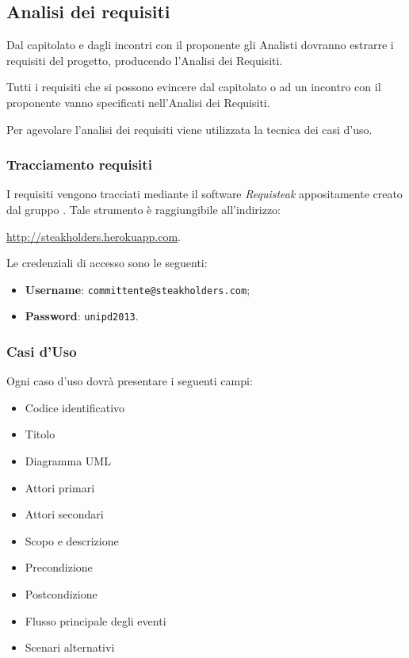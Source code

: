 \subsection{Analisi dei requisiti}

Dal capitolato e dagli incontri con il proponente gli Analisti dovranno estrarre i requisiti del progetto, producendo l'Analisi dei Requisiti.

Tutti i requisiti che si possono evincere dal capitolato o ad un incontro con il proponente vanno specificati nell'Analisi dei Requisiti.

Per agevolare l'analisi dei requisiti viene utilizzata la tecnica dei casi d'uso.

    \subsubsection{Tracciamento requisiti}
     I requisiti vengono tracciati mediante il software \emph{Requisteak} appositamente creato dal gruppo \GroupName{}. Tale strumento è raggiungibile all'indirizzo:
     \begin{center}
         \url{http://steakholders.herokuapp.com}.
     \end{center} 
     Le credenziali di accesso sono le seguenti:
     \begin{itemize}
        \item \textbf{Username}: \texttt{committente@steakholders.com};
        \item \textbf{Password}: \texttt{unipd2013}.
     \end{itemize}
     
\subsubsection{Casi d'Uso}

Ogni caso d'uso dovrà presentare i seguenti campi:
\begin{itemize}
 \item Codice identificativo
 \item Titolo
 \item Diagramma UML
 \item Attori primari
 \item Attori secondari 
 \item Scopo e descrizione
 \item Precondizione
 \item Postcondizione
 \item Flusso principale degli eventi
 \item Scenari alternativi
\end{itemize}

